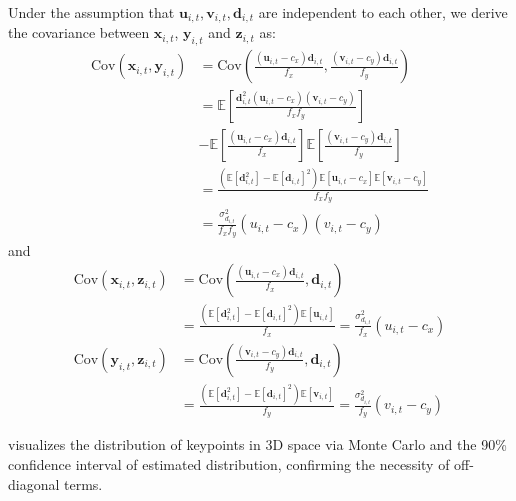 Under the assumption that $\mathbf{u}_{i, t}, \mathbf{v}_{i, t}, \mathbf{d}_{i, t}$ are independent to each other, we derive the covariance between $\mathbf{x}_{i, t}$, $\mathbf{y}_{i, t}$ and $\mathbf{z}_{i, t}$ as:
\begin{equation}
    \begin{aligned}
        \mathrm{Cov}(\mathbf{x}_{i, t}, \mathbf{y}_{i, t}) &= \mathrm{Cov}\left(\frac{(\mathbf{u}_{i, t} - c_x)\mathbf{d}_{i, t}}{f_x}, \frac{(\mathbf{v}_{i, t} - c_y)\mathbf{d}_{i, t}}{f_y}\right)\\
            &= \mathbb{E}\left[\frac{\mathbf{d}_{i, t}^2 (\mathbf{u}_{i, t} - c_x) (\mathbf{v}_{i, t} - c_y)}{f_xf_y}\right] \\
            &- \mathbb{E}\left[\frac{(\mathbf{u}_{i, t} - c_x)\mathbf{d}_{i, t}}{f_x}\right]\mathbb{E}\left[\frac{(\mathbf{v}_{i, t} - c_y)\mathbf{d}_{i, t}}{f_y}\right]\\
            &= \frac{(\mathbb{E}[\mathbf{d}_{i, t}^2] - \mathbb{E}[\mathbf{d}_{i, t}]^2)\mathbb{E}[\mathbf{u}_{i, t} - c_x]\mathbb{E}[\mathbf{v}_{i, t} - c_y]}{f_xf_y}\\
            &= \frac{\sigma_{d_{i, t}}^2}{f_xf_y}(u_{i, t} - c_x) (v_{i, t} - c_y)
    \end{aligned}
\end{equation}
and
\begin{equation}
    \begin{aligned}
    \mathrm{Cov}(\mathbf{x}_{i, t}, \mathbf{z}_{i, t}) &= \mathrm{Cov}\left( \frac{(\mathbf{u}_{i, t} - c_x)\mathbf{d}_{i, t}}{f_x}, \mathbf{d}_{i, t} \right) \\
    &= \frac{(\mathbb{E}[\mathbf{d}_{i, t}^2] - \mathbb{E}[\mathbf{d}_{i, t}]^2)\mathbb{E}[\mathbf{u}_{i, t}]}{f_x} = \frac{\sigma_{d_{i, t}}^2}{f_x}(u_{i, t} - c_x)\\
    \mathrm{Cov}(\mathbf{y}_{i, t}, \mathbf{z}_{i, t}) &= \mathrm{Cov}\left( \frac{(\mathbf{v}_{i, t} - c_y)\mathbf{d}_{i, t}}{f_y}, \mathbf{d}_{i,t} \right)\\
    &= \frac{(\mathbb{E}[\mathbf{d}_{i, t}^2] - \mathbb{E}[\mathbf{d}_{i, t}]^2)\mathbb{E}[\mathbf{v}_{i, t}]}{f_y} = \frac{\sigma_{d_{i, t}}^2}{f_y}(v_{i, t} - c_y)
    \end{aligned}
\end{equation}

 visualizes the distribution of keypoints in 3D space via Monte Carlo and the 90\% confidence interval of estimated distribution, confirming the necessity of off-diagonal terms.

